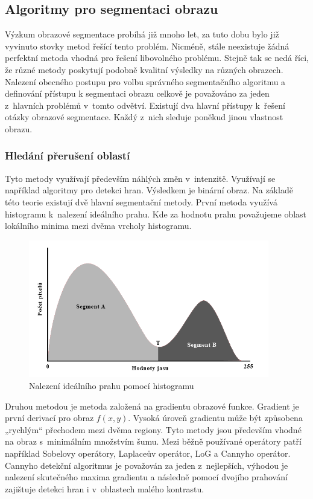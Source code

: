 \documentclass[czech, master, public, dept460, male, cpdeclaration, oneside]{diploma}
\begin{document}
\subsection{Algoritmy pro segmentaci obrazu}
Výzkum obrazové segmentace probíhá již mnoho let, za tuto dobu bylo již vyvinuto stovky metod řešící tento problém. Nicméně, stále neexistuje žádná perfektní metoda vhodná pro řešení libovolného problému. Stejně tak se nedá říci, že různé metody poskytují podobně kvalitní výsledky na různých obrazech. Nalezení obecného postupu pro volbu správného segmentačního algoritmu a definování přístupu k segmentaci obrazu celkově je považováno za jeden z hlavních problémů v tomto odvětví. Existují dva hlavní přístupy k řešení otázky obrazové segmentace. Každý z nich sleduje poněkud jinou vlastnost obrazu.\cite{Dass}

\subsubsection{Hledání přerušení oblastí}
Tyto metody využívají především náhlých změn v intenzitě. Využívají se například algoritmy pro detekci hran. Výsledkem je binární obraz. Na základě této teorie existují dvě hlavní segmentační metody. První metoda využívá histogramu k nalezení ideálního prahu. Kde za hodnotu prahu považujeme oblast lokálního minima mezi dvěma vrcholy histogramu.\cite{Sojka, Dass}

\begin{figure}[H]
	\vspace*{+3.0mm}
	\centering
	\includegraphics[height=6cm]{Figures/explanatory/histogram-auto-threshold.png}
	\caption{Nalezení ideálního prahu pomocí histogramu}
\end{figure}

\noindent
Druhou metodou je metoda založená na gradientu obrazové funkce. Gradient je první derivací pro obraz $f(x, y)$. Vysoká úroveň gradientu může být způsobena „rychlým“ přechodem mezi dvěma regiony. Tyto metody jsou především vhodné na obraz s minimálním množstvím šumu. Mezi běžně používané operátory patří například Sobelovy operátory, Laplaceův operátor, LoG a Cannyho operátor. Cannyho detekční algoritmus je považován za jeden z nejlepších, výhodou je nalezení skutečného maxima gradientu a následně pomocí dvojího prahování zajištuje detekci hran i v oblastech malého kontrastu. \cite{Canny}
\end{document}
